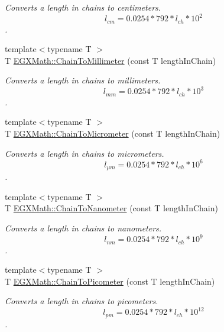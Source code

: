 \begin{DoxyCompactItemize}
\begin{DoxyCompactList}\small\item\em Converts a length in chains to centimeters. \[ l_{cm}=0.0254 * 792 * l_{ch} * 10^{2} \]. \end{DoxyCompactList}\item 
{\footnotesize template$<$typename T $>$ }\\T \mbox{\hyperlink{group___e_g_x_math-_conversions-_length_conversions-_imperial-_chain-_s_i_gab2a17c49dbe6d8ec546e8819de2df33b}{E\+G\+X\+Math\+::\+Chain\+To\+Millimeter}} (const T length\+In\+Chain)
\begin{DoxyCompactList}\small\item\em Converts a length in chains to millimeters. \[ l_{mm}=0.0254 * 792 * l_{ch} * 10^{3} \]. \end{DoxyCompactList}\item 
{\footnotesize template$<$typename T $>$ }\\T \mbox{\hyperlink{group___e_g_x_math-_conversions-_length_conversions-_imperial-_chain-_s_i_gab6d1ab0738e0a31f328352569fa00767}{E\+G\+X\+Math\+::\+Chain\+To\+Micrometer}} (const T length\+In\+Chain)
\begin{DoxyCompactList}\small\item\em Converts a length in chains to micrometers. \[ l_{\mu m}=0.0254 * 792 * l_{ch} * 10^{6} \]. \end{DoxyCompactList}\item 
{\footnotesize template$<$typename T $>$ }\\T \mbox{\hyperlink{group___e_g_x_math-_conversions-_length_conversions-_imperial-_chain-_s_i_ga6120f342646451a0aa544d3fc3699f81}{E\+G\+X\+Math\+::\+Chain\+To\+Nanometer}} (const T length\+In\+Chain)
\begin{DoxyCompactList}\small\item\em Converts a length in chains to nanometers. \[ l_{nm}=0.0254 * 792 * l_{ch} * 10^{9} \]. \end{DoxyCompactList}\item 
{\footnotesize template$<$typename T $>$ }\\T \mbox{\hyperlink{group___e_g_x_math-_conversions-_length_conversions-_imperial-_chain-_s_i_ga27f06f3f63727a16e02afaf8f01f4b45}{E\+G\+X\+Math\+::\+Chain\+To\+Picometer}} (const T length\+In\+Chain)
\begin{DoxyCompactList}\small\item\em Converts a length in chains to picometers. \[ l_{pm}=0.0254 * 792 * l_{ch} * 10^{12} \]. \end{DoxyCompactList}\item 

\end{DoxyCompactItemize}
